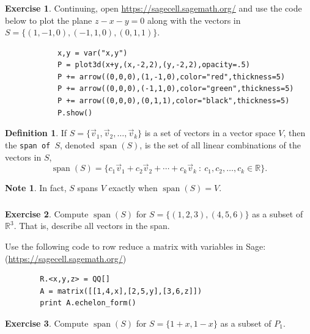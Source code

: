 \documentclass{beamer}
\newcommand{\R}{\mathbb{R}}
\newcommand{\vecv}{\vec{v}}
\newcommand{\fn}{\insertframenumber}
\theoremstyle{definition}
\newtheorem{exercise}{Exercise}
\newtheorem*{defn}{Definition}
\newtheorem*{nb}{Note}
\renewcommand{\emph}[1]{{\color{blue}\texttt{#1}}}
\begin{document}
\begin{frame}[fragile]
	\frametitle{\fn}
	\begin{exercise}
		Continuing, open \url{https://sagecell.sagemath.org/} and use the code below to plot the plane $z-x-y=0$ along with the vectors in $S=\{(1,-1,0),(-1,1,0),(0,1,1)\}$.
		
		\begin{verbatim}
			x,y = var("x,y")
			P = plot3d(x+y,(x,-2,2),(y,-2,2),opacity=.5)
			P += arrow((0,0,0),(1,-1,0),color="red",thickness=5)
			P += arrow((0,0,0),(-1,1,0),color="green",thickness=5)
			P += arrow((0,0,0),(0,1,1),color="black",thickness=5)
			P.show()
		\end{verbatim}
	\end{exercise}
\end{frame}
\begin{frame}{\fn}
	\begin{defn}
		If $S=\{\vec v_1,\vec v_2,\dots,\vecv_k\}$ is a set of vectors in a vector space $V$, then the \emph{span of $S$}, denoted $\operatorname{span}(S)$, is the set of all linear combinations of the vectors in $S$,
			\[\operatorname{span}(S)=\{c_1\vec v_1+c_2\vec v_2+\cdots+c_k\vec v_k\ :\ c_1,c_2,\dots,c_k\in\R\}.\]
	\end{defn}
	\begin{nb}
		In fact, $S$ spans $V$ exactly when $\operatorname{span}(S)=V$.
	\end{nb}
\end{frame}
\begin{frame}[fragile]
	\frametitle{\fn}
	\begin{exercise}
		Compute $\operatorname{span}(S)$ for $S=\{(1,2,3),(4,5,6)\}$ as a subset of $\R^3$. That is, describe all vectors in the span.
		
		Use the following code to row reduce a matrix with variables in Sage: (\url{https://sagecell.sagemath.org/})
		\begin{verbatim}
		R.<x,y,z> = QQ[]
		A = matrix([[1,4,x],[2,5,y],[3,6,z]])
		print A.echelon_form()
		\end{verbatim}
	\end{exercise}
	\begin{exercise}
		Compute $\operatorname{span}(S)$ for $S=\{1+x,1-x\}$ as a subset of $P_1$.
	\end{exercise}
\end{frame}
\end{document}
